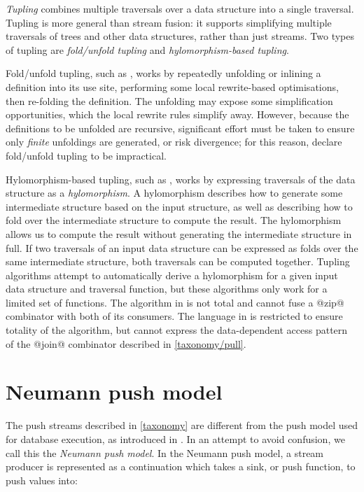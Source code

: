 \emph{Tupling} combines multiple traversals over a data structure into a single traversal.
Tupling is more general than stream fusion: it supports simplifying multiple traversals of trees and other data structures, rather than just streams.
Two types of tupling are \emph{fold/unfold tupling} and \emph{hylomorphism-based tupling}.

Fold/unfold tupling, such as \citet{chiba2010program}, works by repeatedly unfolding or inlining a definition into its use site, performing some local rewrite-based optimisations, then re-folding the definition.
The unfolding may expose some simplification opportunities, which the local rewrite rules simplify away.
However, because the definitions to be unfolded are recursive, significant effort must be taken to ensure only \emph{finite} unfoldings are generated, or risk divergence; for this reason, \citet{hu1997tupling} declare fold/unfold tupling to be impractical.

Hylomorphism-based tupling, such as \citet{hu1996cheap}, works by expressing traversals of the data structure as a \emph{hylomorphism}.
A hylomorphism describes how to generate some intermediate structure based on the input structure, as well as describing how to fold over the intermediate structure to compute the result.
The hylomorphism allows us to compute the result without generating the intermediate structure in full.
If two traversals of an input data structure can be expressed as folds over the same intermediate structure, both traversals can be computed together.
Tupling algorithms attempt to automatically derive a hylomorphism for a given input data structure and traversal function, but these algorithms only work for a limited set of functions.
The algorithm in \citet{launchbury1995warm} is not total and cannot fuse a @zip@ combinator with both of its consumers.
The language in \citet{hu1996deriving} is restricted to ensure totality of the algorithm, but cannot express the data-dependent access pattern of the @join@ combinator described in \cref{taxonomy/pull}.


\section{Neumann push model}
\label{related/push-model}

The push streams described in \cref{taxonomy} are different from the push model used for database execution, as introduced in \citet{neumann2011efficiently}.
In an attempt to avoid confusion, we call this the \emph{Neumann push model}.
In the Neumann push model, a stream producer is represented as a continuation which takes a sink, or push function, to push values into:

